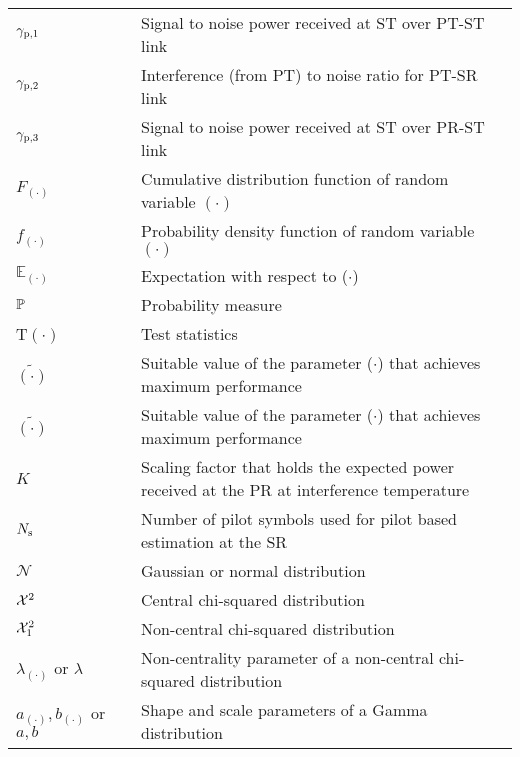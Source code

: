 \begin{longtable}{p{}p{}p{}}
	${\gamma}_{\text{p,1}}$  		& &		Signal to noise power received at ST over PT-ST link \\ 
        ${\gamma}_{\text{p,2}}$                & &             Interference (from PT) to noise ratio for PT-SR link \\
	${\gamma}_{\text{p,3}}$  		& &		Signal to noise power received at ST over PR-ST link \\ 
       $F_{(\cdot)}$            & &          Cumulative distribution function of random variable $(\cdot)$ \\
       $f_{(\cdot)}$            & &          Probability density function of random variable $(\cdot)$ \\
       $\mathbb E_{(\cdot)}$    & &		Expectation with respect to ($\cdot$) \\
       $\mathbb P$                     & &     	Probability measure \\
       T$(\cdot)$  	        & &          Test statistics \\
       $\tilde{(\cdot)}$        & &		Suitable value of the parameter ($\cdot$) that achieves maximum performance \\
       $\tilde{(\cdot)}$        & &		Suitable value of the parameter ($\cdot$) that achieves maximum performance \\
       $K$                      & &      Scaling factor that holds the expected power received at the PR at interference temperature  \\
       $N_{\text{s}}$                    & &      Number of pilot symbols used for pilot based estimation at the SR \\
       $\mathcal N$                & &      Gaussian or normal distribution\\
       $\cchi2 $                & &      Central chi-squared distribution \\
       $\ncchi2$                & &      Non-central chi-squared distribution \\
       $\lambda_{(\cdot)}$ or $\lambda$  &     &       Non-centrality parameter of a non-central chi-squared distribution \\
       $a_{(\cdot)}, b_{(\cdot)}$ or $a, b$ &  &       Shape and scale parameters of a Gamma distribution \\


\end{longtable}
